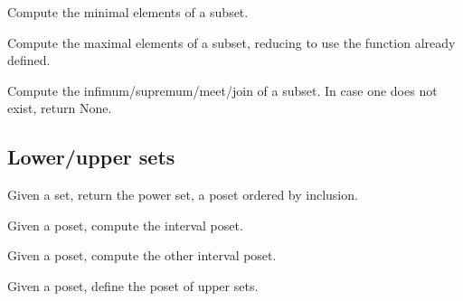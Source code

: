 \begin{exercise}
  Compute the minimal elements of a subset.


\end{exercise}


\begin{exercise}
  Compute the maximal elements of a subset, reducing
  to use the function  already defined.


\end{exercise}


\begin{exercise}
  Compute the infimum/supremum/meet/join of a subset.
  In case one does not exist, return None.


\end{exercise}

\subsection{Lower/upper sets}
\begin{exercise}
  Given a set, return the power set, a poset ordered by inclusion.

\end{exercise}


\begin{exercise}
  Given a poset, compute the interval poset.

\end{exercise}


\begin{exercise}
  Given a poset, compute the other interval poset.

\end{exercise}


\begin{exercise}
  Given a poset, define the poset of upper sets.

\end{exercise}

